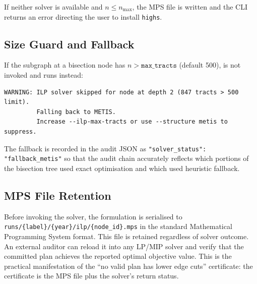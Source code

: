 If neither solver is available and $n \leq n_{\max}$, the MPS file is
written and the CLI returns an error directing the user to install
\texttt{highs}.

\subsection{Size Guard and Fallback}

If the subgraph at a bisection node has $n > \texttt{max\_tracts}$
(default 500), \ilp{} is not invoked and \metis{} runs instead:

\begin{verbatim}
WARNING: ILP solver skipped for node at depth 2 (847 tracts > 500 limit).
         Falling back to METIS.
         Increase --ilp-max-tracts or use --structure metis to suppress.
\end{verbatim}

The fallback is recorded in the audit JSON as
\texttt{"solver\_status": "fallback\_metis"} so that the audit chain
accurately reflects which portions of the bisection tree used exact
optimisation and which used heuristic fallback.

\subsection{MPS File Retention}

Before invoking the solver, the formulation is serialised to
\texttt{runs/\{label\}/\{year\}/ilp/\{node\_id\}.mps} in the standard
Mathematical Programming System format.
This file is retained regardless of solver outcome.
An external auditor can reload it into any LP/MIP solver and verify that
the committed plan achieves the reported optimal objective value.
This is the practical manifestation of the ``no valid plan has lower
edge cuts'' certificate: the certificate is the MPS file plus the
solver's return status.
